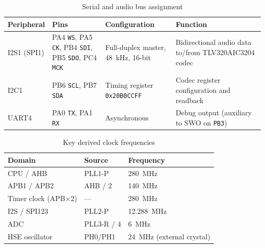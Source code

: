 \begin{table}[H]
	\centering
	\caption{Serial and audio bus assignment}
	\label{tab:serial}
	\small
	\begin{tabular}{lp{3.5cm}p{3.5cm}p{5cm}}
		\toprule
		\textbf{Peripheral} & \textbf{Pins} & \textbf{Configuration} & \textbf{Function} \\
		\midrule
		I2S1 (SPI1) &
		PA4 \texttt{WS}, PA5 \texttt{CK}, PB4 \texttt{SDI}, PB5 \texttt{SDO}, PC4 \texttt{MCK} &
		Full-duplex master, \SI{48}{\kilo\hertz}, 16-bit &
		Bidirectional audio data to/from TLV320AIC3204 codec \\
		\addlinespace
		I2C1 &
		PB6 \texttt{SCL}, PB7 \texttt{SDA} &
		Timing register \texttt{0x20B0CCFF} &
		Codec register configuration and readback \\
		\addlinespace
		UART4 &
		PA0 \texttt{TX}, PA1 \texttt{RX} &
		Asynchronous &
		Debug output (auxiliary to \ac{SWO} on \texttt{PB3}) \\
		\bottomrule
	\end{tabular}
\end{table}


\begin{table}[H]
	\centering
	\caption{Key derived clock frequencies}
	\label{tab:clocks}
	\small
	\begin{tabular}{lll}
		\toprule
		\textbf{Domain} & \textbf{Source} & \textbf{Frequency} \\
		\midrule
		CPU / AHB        & PLL1-P & \SI{280}{\mega\hertz} \\
		APB1 / APB2      & AHB / 2 & \SI{140}{\mega\hertz} \\
		Timer clock (APB×2) & — & \SI{280}{\mega\hertz} \\
		I2S / SPI123     & PLL2-P & \SI{12.288}{\mega\hertz} \\
		ADC              & PLL3-R / 4 & \SI{6}{\mega\hertz} \\
		HSE oscillator   & PH0/PH1 & \SI{24}{\mega\hertz} (external crystal) \\
		\bottomrule
	\end{tabular}
\end{table}
